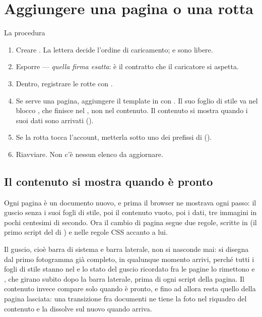 \section{Aggiungere una pagina o una rotta}\label{sez:pagina-nuova}

\begin{pratica}{La procedura}
\begin{enumerate}
  \item Creare . La lettera decide
        l'ordine di caricamento;  e  sono libere.
  \item Esporre  ---
        \emph{quella firma esatta}: è il contratto che il caricatore si
        aspetta.
  \item Dentro, registrare le rotte con .
  \item Se serve una pagina, aggiungere il template in
         con .
        Il suo foglio di stile va nel blocco , che finisce nel
        , non nel contenuto. Il contenuto si mostra quando i suoi
        dati sono arrivati ().
  \item Se la rotta tocca l'account, metterla sotto uno dei prefissi di
         ().
  \item Riavviare. Non c'è nessun elenco da aggiornare.
\end{enumerate}
\end{pratica}

\subsection{Il contenuto si mostra quando è pronto}\label{sez:pagina-pronta}

Ogni pagina è un documento nuovo, e prima il browser ne mostrava ogni passo:
il guscio senza i suoi fogli di stile, poi il contenuto vuoto, poi i dati,
tre immagini in pochi centesimi di secondo. Ora il cambio di pagina segue
due regole, scritte in  (il primo script
del  di ) e nelle regole CSS accanto a lui.

Il guscio, cioè barra di sistema e barra laterale, non si nasconde mai: si
disegna dal primo fotogramma già completo, in qualunque momento arrivi,
perché tutti i fogli di stile stanno nel  e lo stato del guscio
ricordato fra le pagine lo rimettono  e
, che girano subito dopo la barra laterale, prima di
ogni script della pagina. Il contenuto invece compare solo quando è pronto,
e fino ad allora resta quello della pagina lasciata: una transizione fra
documenti ne tiene la foto nel riquadro del contenuto e la dissolve sul
nuovo quando arriva.

